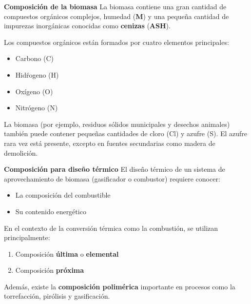 \documentclass[../../main.tex]{subfiles}
\begin{document}
\begin{frame}{\textbf{Composici\'on de la biomasa}}
La biomasa contiene una gran cantidad de compuestos org\'anicos complejos, humedad (\textbf{M}) y una peque\~na cantidad de impurezas inorg\'anicas conocidas como \textbf{cenizas} (\textbf{ASH}).

Los compuestos org\'anicos est\'an formados por cuatro elementos principales:
\begin{itemize}
    \item Carbono (C)
    \item Hid\'rogeno (H)
    \item Ox\'igeno (O)
    \item Nitr\'ogeno (N)
\end{itemize}

La biomasa (por ejemplo, residuos s\'olidos municipales y desechos animales) tambi\'en puede contener peque\~nas cantidades de cloro (Cl) y azufre (S). El azufre rara vez est\'a presente, excepto en fuentes secundarias como madera de demolici\'on.

\end{frame}

\begin{frame}{\textbf{Composici\'on para dise\~no t\'ermico}}
El dise\~no t\'ermico de un sistema de aprovechamiento de biomasa (gasificador o combustor) requiere conocer:
\begin{itemize}
    \item La composici\'on del combustible
    \item Su contenido energ\'etico
\end{itemize}

En el contexto de la conversi\'on t\'ermica como la combusti\'on, se utilizan principalmente:
\begin{enumerate}
    \item Composici\'on \textbf{\'ultima} o \textbf{elemental}
    \item Composici\'on \textbf{pr\'oxima}
\end{enumerate}

Adem\'as, existe la \textbf{composici\'on polim\'erica} importante en procesos como la torrefacci\'on, pir\'olisis y gasificaci\'on.
\end{frame}
\end{document}
